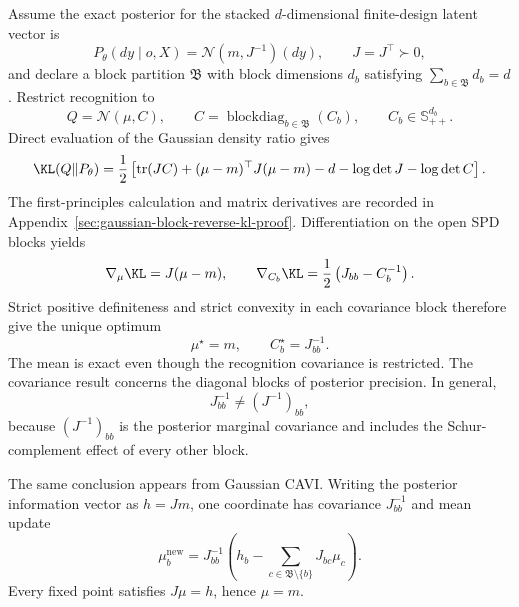 Assume the exact posterior for the stacked \(d\)-dimensional finite-design latent vector is
\begin{equation}
P_\theta(dy\mid o,X)=\mathcal N(m,J^{-1})(dy),
\qquad
J=J^\top\succ0,
\label{eq:gaussian-exact-posterior}
\end{equation}
and declare a block partition \(\mathfrak B\) with block dimensions \(d_b\) satisfying \(\sum_{b\in\mathfrak B}d_b=d\). Restrict recognition to
\begin{equation}
Q=\mathcal N(\mu,C),
\qquad
C=\operatorname{blockdiag}_{b\in\mathfrak B}(C_b),
\qquad
C_b\in\mathbb S_{++}^{d_b}.
\label{eq:gaussian-block-product-family}
\end{equation}
Direct evaluation of the Gaussian density ratio gives
\begin{equation}
\KL(Q\Vert P_\theta)
=\frac12\left[
\operatorname{tr}(JC)
+(\mu-m)^\top J(\mu-m)
-d-\log\det J-\log\det C
\right].
\label{eq:gaussian-reverse-kl-block}
\end{equation}
The first-principles calculation and matrix derivatives are recorded in Appendix~\ref{sec:gaussian-block-reverse-kl-proof}. Differentiation on the open SPD blocks yields
\begin{equation}
\nabla_\mu\KL=J(\mu-m),
\qquad
\nabla_{C_b}\KL=\frac12\left(J_{bb}-C_b^{-1}\right).
\label{eq:gaussian-reverse-kl-derivatives}
\end{equation}
Strict positive definiteness and strict convexity in each covariance block therefore give the unique optimum
\begin{equation}
\mu^\star=m,
\qquad
C_b^\star=J_{bb}^{-1}.
\label{eq:gaussian-block-reverse-kl-optimum}
\end{equation}
The mean is exact even though the recognition covariance is restricted. The covariance result concerns the diagonal blocks of posterior precision. In general,
\begin{equation}
J_{bb}^{-1}\neq(J^{-1})_{bb},
\label{eq:precision-block-not-marginal-covariance}
\end{equation}
because \((J^{-1})_{bb}\) is the posterior marginal covariance and includes the Schur-complement effect of every other block.

The same conclusion appears from Gaussian CAVI. Writing the posterior information vector as \(h=Jm\), one coordinate has covariance \(J_{bb}^{-1}\) and mean update
\begin{equation}
\mu_b^{\mathrm{new}}
=J_{bb}^{-1}
\left(h_b-\sum_{c\in\mathfrak B\setminus\{b\}}J_{bc}\mu_c\right).
\label{eq:gaussian-cavi-mean-update}
\end{equation}
Every fixed point satisfies \(J\mu=h\), hence \(\mu=m\).

